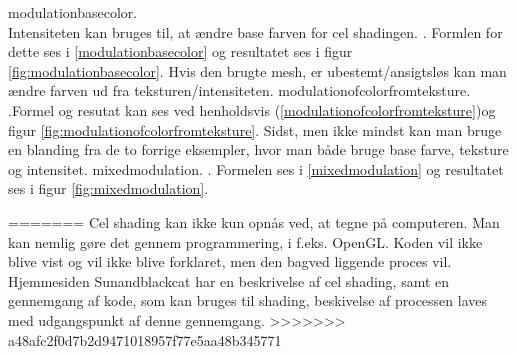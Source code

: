  {modulationbasecolor}. 
\\Intensiteten kan bruges til, at ændre base farven for cel shadingen. . Formlen for dette ses i \ref{modulationbasecolor} og resultatet ses i figur \ref{fig:modulationbasecolor}. 
Hvis den brugte mesh, er ubestemt/ansigtsløs kan man ændre farven ud fra teksturen/intensiteten.  {modulationofcolorfromteksture}. .Formel og resutat kan ses ved henholdsvis (\ref{modulationofcolorfromteksture})og figur \ref{fig:modulationofcolorfromteksture}. Sidst, men ikke mindst kan man bruge en blanding fra de to forrige eksempler, hvor man både bruge base farve, teksture og intensitet. {mixedmodulation}. . Formelen ses i \ref{mixedmodulation} og resultatet ses i figur \ref{fig:mixedmodulation}. 



=======
Cel shading kan ikke kun opnås ved, at tegne på computeren. Man kan nemlig gøre det gennem programmering, i f.eks. OpenGL. Koden vil ikke blive vist og vil ikke blive forklaret, men den bagved liggende proces vil. Hjemmesiden Sunandblackcat \cite{sunandblackcat2016} har en beskrivelse af cel shading, samt en gennemgang af kode, som kan bruges til shading, beskivelse af processen laves med udgangspunkt af denne gennemgang. 
>>>>>>> a48afc2f0d7b2d9471018957f77e5aa48b345771

